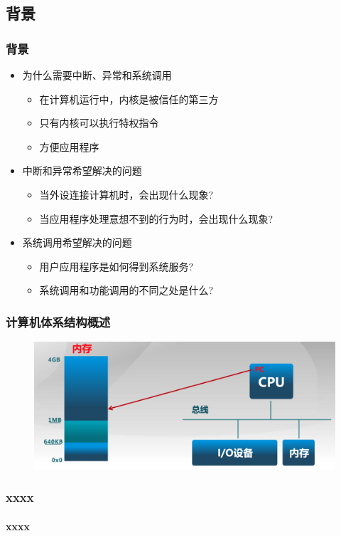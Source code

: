 \subsection{背景} %
\begin{frame}
	\frametitle{背景}
    \begin{itemize}
        \item 为什么需要中断、异常和系统调用
        \begin{itemize}
            \item 在计算机运行中，内核是被信任的第三方
            \item 只有内核可以执行特权指令
            \item 方便应用程序
        \end{itemize}
        \item 中断和异常希望解决的问题
        \begin{itemize}
            \item 当外设连接计算机时，会出现什么现象?
            \item 当应用程序处理意想不到的行为时，会出现什么现象?
        \end{itemize}
        \item 系统调用希望解决的问题
        \begin{itemize}
            \item 用户应用程序是如何得到系统服务?
            \item 系统调用和功能调用的不同之处是什么?
        \end{itemize}
    \end{itemize}
\end{frame}
\begin{frame}
	\frametitle{计算机体系结构概述}
\begin{figure}
    \includegraphics[width=0.8\linewidth]{architecture}
\end{figure}

\end{frame}
% 
\begin{frame}
	\frametitle{xxxx}
	\framesubtitle{xxxx}
\end{frame}

